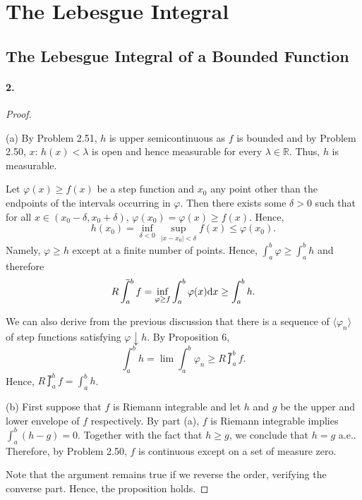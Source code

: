 \section{The Lebesgue Integral}
\setcounter{subsection}{1}

\subsection{The Lebesgue Integral of a Bounded Function}
  \paragraph{2.}
  \begin{proof}
    $\,$\par
    (a) By Problem 2.51, $h$ is upper semicontinuous as $f$ is bounded and by 
    Problem 2.50, ${x:\, h(x)<\lambda}$ is open and hence measurable for every
    $\lambda\in\mathbb{R}$. Thus, $h$ is measurable.\par
    Let $\varphi(x)\ge f(x)$ be a step function and $x_0$ any point other 
    than the endpoints of the intervals occurring in $\varphi$. Then there 
    exists some $\delta>0$ such that for all $x\in(x_0-\delta,x_0+\delta)$, 
    $\varphi(x_0) = \varphi(x) \ge f(x)$. Hence,
    \[
      h(x_0) = \inf_{\delta<0}\sup_{|x-x_0|<\delta}f(x) \le \varphi(x_0).
    \]
    Namely, $\varphi\ge h$ except at a finite number of points. Hence, $\int_a^b
    \varphi \ge \int_a^b h$ and therefore
    \[
      R\upint_a^b f = \inf_{\varphi\ge f}\int_a^b\varphi(x)\rd x \ge \int_a^b h.
    \]\par
    We can also derive from the previous discussion that there is a sequence of 
    $\langle\varphi_n\rangle$ of step functions satisfying $\varphi \downarrow h$. By 
    Proposition 6,
    \[
      \int_a^b h = \lim\int_a^b\varphi_n \ge R\upint_a^b f.
    \]
    Hence, $R\upint_a^b f = \int_a^b h$.\par
    (b) First suppose that $f$ is Riemann integrable and let $h$ and $g$ be the 
    upper and lower envelope of $f$ respectively. By part (a), $f$ is Riemann 
    integrable implies $\int_a^b(h-g) = 0$. Together with the fact that $h\ge 
    g$, we conclude that $h=g$ a.e.. Therefore, by Problem 2.50, $f$ is 
    continuous except on a set of measure zero.\par
    Note that the argument remains true if we reverse the order, verifying the 
    converse part. Hence, the proposition holds.
  \end{proof}

